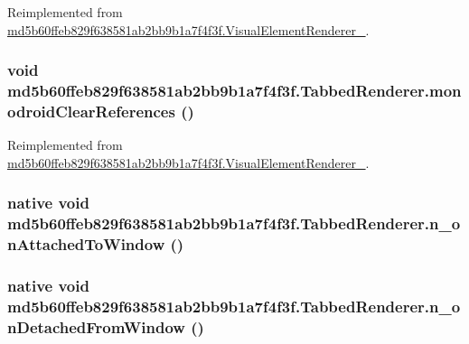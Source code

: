 Reimplemented from \hyperlink{classmd5b60ffeb829f638581ab2bb9b1a7f4f3f_1_1_visual_element_renderer__1_321b2967faff34b0f7971f55915f583e}{md5b60ffeb829f638581ab2bb9b1a7f4f3f.VisualElementRenderer\_}.\hypertarget{classmd5b60ffeb829f638581ab2bb9b1a7f4f3f_1_1_tabbed_renderer_798c70a93fbc1b979f670015b6d12ed9}{
\subsubsection[{monodroidClearReferences}]{\setlength{\rightskip}{0pt plus 5cm}void md5b60ffeb829f638581ab2bb9b1a7f4f3f.TabbedRenderer.monodroidClearReferences ()}}
\label{classmd5b60ffeb829f638581ab2bb9b1a7f4f3f_1_1_tabbed_renderer_798c70a93fbc1b979f670015b6d12ed9}




Reimplemented from \hyperlink{classmd5b60ffeb829f638581ab2bb9b1a7f4f3f_1_1_visual_element_renderer__1_4a1c180026d8eab71549e47b7de4b9b8}{md5b60ffeb829f638581ab2bb9b1a7f4f3f.VisualElementRenderer\_}.\hypertarget{classmd5b60ffeb829f638581ab2bb9b1a7f4f3f_1_1_tabbed_renderer_c552558d45baca5c9e063a2a285e54e4}{
\subsubsection[{n\_\-onAttachedToWindow}]{\setlength{\rightskip}{0pt plus 5cm}native void md5b60ffeb829f638581ab2bb9b1a7f4f3f.TabbedRenderer.n\_\-onAttachedToWindow ()}}
\label{classmd5b60ffeb829f638581ab2bb9b1a7f4f3f_1_1_tabbed_renderer_c552558d45baca5c9e063a2a285e54e4}


\hypertarget{classmd5b60ffeb829f638581ab2bb9b1a7f4f3f_1_1_tabbed_renderer_8a43df8840c31f22c2e855fce9416b1b}{
\subsubsection[{n\_\-onDetachedFromWindow}]{\setlength{\rightskip}{0pt plus 5cm}native void md5b60ffeb829f638581ab2bb9b1a7f4f3f.TabbedRenderer.n\_\-onDetachedFromWindow ()}}
\label{classmd5b60ffeb829f638581ab2bb9b1a7f4f3f_1_1_tabbed_renderer_8a43df8840c31f22c2e855fce9416b1b}


